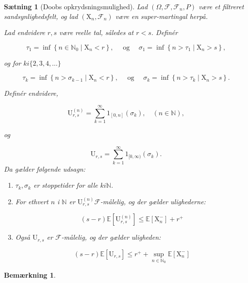 \documentclass{article}
\newcommand{\1}{\mathbbm{1}}
\theoremstyle{boxed}
\newtheorem{remark}[theorem]{Bemærkning}
\newtheorem{proposition}[theorem]{Sætning}
\begin{document}
\begin{theorem-box}
    \begin{proposition}[Doobs opkrydsningsmulighed]
        Lad $\left(\Omega, \mathcal{F}, \mathcal{F}_n, P\right)$ være et filtreret sandsynlighedsfelt, og lad $\left(\mathrm{X}_n, \mathcal{F}_n\right)$ være en super-martingal herpå.

Lad endvidere $r, s$ være reelle tal, således at $r<s$.
Definér

$$
\tau_1=\inf \left\{n \in \mathbb{N}_0 \mid \mathrm{X}_n<r\right\}, \quad \text { og } \quad \sigma_1=\inf \left\{n>\tau_1 \mid \mathrm{X}_n>s\right\},
$$

og for $k i\{2,3,4, \ldots\}$

$$
\tau_k=\inf \left\{n>\sigma_{k-1} \mid \mathrm{X}_n<r\right\}, \quad \text { og } \quad \sigma_k=\inf \left\{n>\tau_k \mid \mathrm{X}_n>s\right\} .
$$


Definér endvidere,

$$
\mathrm{U}_{r, s}^{(n)}=\sum_{k=1}^{\infty} 1_{[0, n]}\left(\sigma_k\right), \quad(n \in \mathbb{N}),
$$

og

$$
\mathrm{U}_{r, s}=\sum_{k=1}^{\infty} 1_{[0, \infty)}\left(\sigma_k\right) .
$$
Da gælder følgende udsagn:
\begin{enumerate}
    \item[\textnormal{(i)}]  $\tau_k, \sigma_k$ er stoppetider for alle $k i \mathbb{N}$.
    \item[\textnormal{(ii)}] For ethvert $n$ i $\mathbb{N}$ er $\mathrm{U}_{r, s}^{(n)} \mathcal{F}$-målelig, og der gælder ulighederne:

    $$
    (s-r) \mathbb{E}\left[\mathrm{U}_{r, s}^{(n)}\right] \leq \mathbb{E}\left[\mathrm{X}_n^{-}\right]+r^{+}
    $$
    \item[\textnormal{(iii)}] Også $\mathrm{U}_{r, s}$ er $\mathcal{F}$-målelig, og der gælder uligheden:

    $$
    (s-r) \mathbb{E}\left[\mathrm{U}_{r, s}\right] \leq r^{+}+\sup _{n \in \mathbb{N}_0} \mathbb{E}\left[\mathrm{X}_n^{-}\right]
    $$
\end{enumerate}
    \end{proposition}
\end{theorem-box}
\begin{remark}
    
\end{remark}
\end{document}
